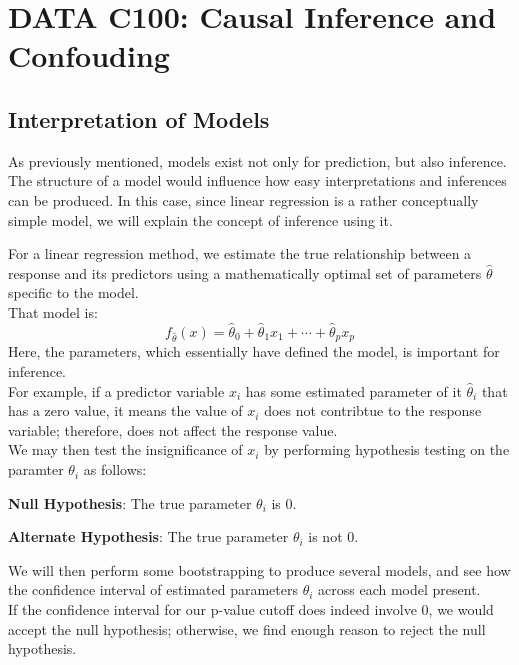 \chapter{DATA C100: Causal Inference and Confouding}

\section{Interpretation of Models}
As previously mentioned, models exist not only for prediction, but also inference. \\
The structure of a model would influence how easy interpretations and inferences can be produced. In this case, since linear regression is a rather conceptually simple model, we will explain the concept of inference using it.

For a linear regression method, we estimate the true relationship between a response and its predictors using a mathematically optimal set of parameters $\hat{\theta}$ specific to the model. \\
That model is:
\[
    f_{\hat{\theta}}(x) = \hat{\theta}_0 + \hat{\theta}_1 x_1 + \cdots + \hat{\theta}_p x_p
\]
Here, the parameters, which essentially have defined the model, is important for inference. \\
For example, if a predictor variable $x_i$ has some estimated parameter of it $\hat{\theta}_i$ that has a zero value, it means the value of $x_i$ does not contribtue to the response variable; therefore, does not affect the response value. \\
We may then test the insignificance of $x_i$ by performing hypothesis testing on the paramter $\theta_i$ as follows:
\begin{bindenum}
    \item \textbf{Null Hypothesis}: The true parameter $\theta_i$ is $0$.
    \item \textbf{Alternate Hypothesis}: The true parameter $\theta_i$ is not $0$.
\end{bindenum}
We will then perform some bootstrapping to produce several models, and see how the confidence interval of estimated parameters $\theta_i$ across each model present. \\
If the confidence interval for our p-value cutoff does indeed involve $0$, we would accept the null hypothesis; otherwise, we find enough reason to reject the null hypothesis.

